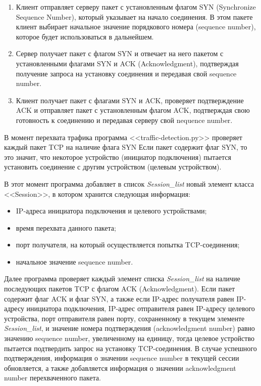 \documentclass[bachelor, och, coursework]{SCWorks}
\begin{document}
\begin{enumerate}
  \item Клиент отправляет серверу пакет с установленным флагом SYN (Synchronize Sequence Number), который указывает на начало соединения. В этом 
  пакете клиент выбирает начальное значение порядкового номера (sequence number), которое будет использоваться в дальнейшем.
  \item Сервер получает пакет с флагом SYN и отвечает на него пакетом с установленными флагами SYN и ACK (Acknowledgment), подтверждая получение 
  запроса на установку соединения и передавая свой sequence number.
  \item Клиент получает пакет с флагами SYN и ACK, проверяет подтверждение ACK и отправляет пакет с установленным флагом ACK, подтверждая свою 
  готовность к соединению и передавая серверу свой nequence number.
\end{enumerate}

В момент перехвата трафика программа <<traffic-detection.py>> проверяет каждый пакет TCP на наличие флага SYN 
Если пакет содержит флаг SYN, то это значит, что некоторое устройство (инициатор подключения) пытается установить соединение с другим устройством
(целевым устройством). 

В этот момент программа добавляет в 
список \textit{Session\_list} новый элемент класса <<Session>>, в котором хранится следующая информация:


\begin{itemize}
  \item IP-адреса инициатора подключения и целевого устройствами;
  \item время перехвата данного пакета;
  \item порт получателя, на который осуществляется попытка TCP-соединения;
  \item начальное значение sequence number. 
\end{itemize}


Далее программа проверяет каждый элемент списка \textit{Session\_list} на наличие последующих пакетов TCP с флагом ACK (Acknowledgment). 
Если пакет содержит флаг ACK и флаг SYN, а также если IP-адрес получателя равен IP-адресу инициатора подключения, IP-адрес отправителя 
равен IP-адресу целевого устройства, порт отправителя равен порту, сохраненному в текущем элементе \textit{Session\_list}, и значение 
номера подтверждения (acknowledgment number) равно значению sequence number, увеличенному на единицу, тогда целевое устройство 
пытается подтвердить запрос на 
установку TCP-соединения. В случае успешного подтверждения, информация о значении sequence number в текущей сессии обновляется, а также 
добавляется информация о значении acknowledgment number перехваченного пакета.
\end{document}
